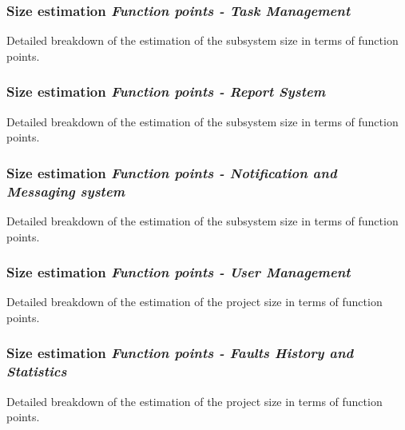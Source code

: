 
\begin{frame}
\frametitle{Size estimation \hfill \emph{Function points - Task Management}}
\begin{table}[hbtp]
\centering

\caption{Detailed breakdown of the estimation of the subsystem size in terms of function points.}
\label{tblFunctionPointsSize}
\end{table}
\end{frame}

\begin{frame}
\frametitle{Size estimation \hfill \emph{Function points - Report System}}
\begin{table}[hbtp]
\centering

\caption{Detailed breakdown of the estimation of the subsystem size in terms of function points.}
\label{tblFunctionPointsSize}
\end{table}
\end{frame}

\begin{frame}
\frametitle{Size estimation \hfill \emph{Function points - Notification and Messaging system}}
\begin{table}[hbtp]
\centering

\caption{Detailed breakdown of the estimation of the subsystem size in terms of function points.}
\label{tblFunctionPointsSize}
\end{table}
\end{frame}

\begin{frame}
\frametitle{Size estimation \hfill \emph{Function points - User Management}}
\begin{table}[hbtp]
\centering

\caption{Detailed breakdown of the estimation of the project size in terms of function points.}
\label{tblFunctionPointsSize}
\end{table}
\end{frame}

\begin{frame}
\frametitle{Size estimation \hfill \emph{Function points - Faults History and Statistics}}
\begin{table}[hbtp]
\centering

\caption{Detailed breakdown of the estimation of the project size in terms of function points.}
\label{tblFunctionPointsSize}
\end{table}
\end{frame}

